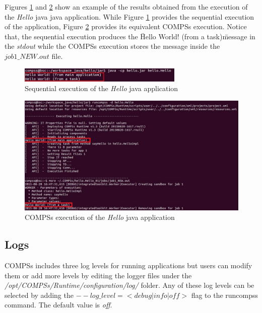 Figures \ref{fig:hello_seq} and \ref{fig:hello_compss} show an example of the results obtained from the execution of the \textit{Hello} java 
java application. While Figure \ref{fig:hello_seq} provides the sequential execution of the application, Figure \ref{fig:hello_compss}
provides its equivalent COMPSs execution. Notice that, the sequential execution produces the \" Hello World! (from a task)\" message
in the \textit{stdout} while the COMPSs execution stores the message inside the \textit{$job1\_NEW.out$} file.
\begin{figure}[h!]
  \centering
    \includegraphics[width=0.7\textwidth]{./Sections/3_Results_and_Logs/Figures/hello_seq_stdout.jpeg}
    \caption{Sequential execution of the \textit{Hello} java application}
    \label{fig:hello_seq}
\end{figure}

\begin{figure}[h!]
  \centering
    \includegraphics[width=\textwidth]{./Sections/3_Results_and_Logs/Figures/hello_compss_stdout_and_job.jpeg}
    \caption{COMPSs execution of the \textit{Hello} java application}
    \label{fig:hello_compss}
\end{figure}
\newpage

\subsection{Logs}
COMPSs includes three log levels for running applications but users can modify them or add more levels by editing the
logger files under the \textit{/opt/COMPSs/Runtime/configuration/log/} folder. Any of these log levels can be selected by 
adding the \textit{$--log\_level=<debug | info | off >$} flag to the runcompss command. The default value is \textit{off}.

